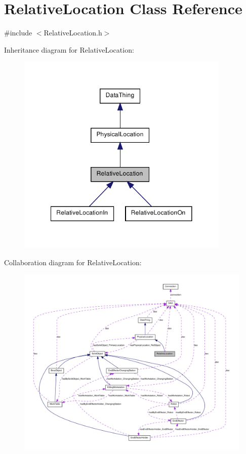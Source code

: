 \hypertarget{class_relative_location}{
\section{RelativeLocation Class Reference}
\label{class_relative_location}
}


{\ttfamily \#include $<$RelativeLocation.h$>$}



Inheritance diagram for RelativeLocation:\nopagebreak
\begin{figure}[H]
\begin{center}
\leavevmode
\includegraphics[width=288pt]{class_relative_location__inherit__graph}
\end{center}
\end{figure}


Collaboration diagram for RelativeLocation:\nopagebreak
\begin{figure}[H]
\begin{center}
\leavevmode
\includegraphics[width=400pt]{class_relative_location__coll__graph}
\end{center}
\end{figure}
